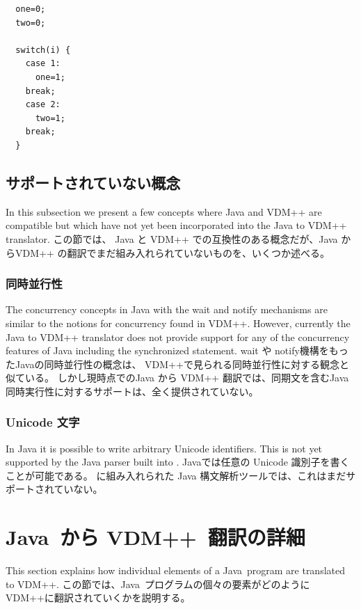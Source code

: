 \documentclass[\pformat,12pt]{jarticle}
\newcommand{\vdmslpp}{VDM++}
\newcommand{\JAVA}{Java}
\begin{document}
\begin{small}
\begin{verbatim}
  one=0;
  two=0;

  switch(i) {
    case 1:
      one=1;
    break;
    case 2:
      two=1;
    break;
  }
\end{verbatim}
\end{small}


\subsection{サポートされていない概念}

In this subsection we present a few concepts where Java and VDM++ are
compatible but which have not yet been incorporated into the Java to
VDM++ translator. 
この節では、 Java と VDM++ での互換性のある概念だが、Java からVDM++ の翻訳でまだ組み入れられていないものを、いくつか述べる。

\subsubsection{同時並行性}

The concurrency concepts in Java with the wait and notify mechanisms
are similar to the notions for concurrency found in VDM++. However,
currently the Java to VDM++ translator does not provide support
for any of the concurrency features of Java including the
synchronized statement.
wait や notify機構をもったJavaの同時並行性の概念は、 VDM++で見られる同時並行性に対する観念と似ている。
しかし現時点でのJava から VDM++ 翻訳では、同期文を含むJava同時実行性に対するサポートは、全く提供されていない。

\subsubsection{Unicode 文字}

In Java it is possible to write arbitrary Unicode identifiers. This is
not yet supported by the Java parser built into \VDMTools.
 Javaでは任意の Unicode 識別子を書くことが可能である。
 \VDMTools に組み入れられた Java 構文解析ツールでは、これはまだサポートされていない。

\newpage
\section{\JAVA\ から \vdmslpp\ 翻訳の詳細}\label{sec:translation}

This section explains how individual elements of a \JAVA\ program are
translated to \vdmslpp.
この節では、\JAVA\ プログラムの個々の要素がどのように \vdmslpp に翻訳されていくかを説明する。
\end{document}
